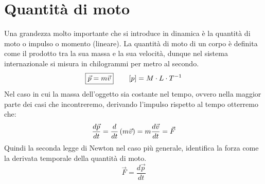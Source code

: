\section{Quantità di moto}
Una grandezza molto importante che si introduce in dinamica è la quantità
di moto o impulso o momento (lineare). La quantità di moto di un corpo è
definita come il prodotto tra la sua massa e la sua velocità, dunque nel
sistema internazionale si misura in chilogrammi per metro al secondo.
\begin{equation}
    \boxed{\vec p = m\vec v}\quad\quad \left[ p\right] = M\cdot L\cdot T^{-1}
\label{eq:pulse_def}
\end{equation}
Nel caso in cui la massa dell'oggetto sia costante nel tempo, ovvero nella
maggior parte dei casi che incontreremo, derivando l'impulso rispetto al
tempo otterremo che:
\begin{equation}
    \frac{d\vec p}{dt} = \frac d{dt}\left( m\vec v\right) =
    m\frac{d\vec v}{dt} =\vec F
\end{equation}
Quindi la seconda legge di Newton nel caso più generale, identifica la
forza come la derivata temporale della quantità di moto.
\begin{equation}
    \boxed{\vec F = \frac{d\vec p}{dt}}
\label{eq:newt2law_p}
\end{equation}
